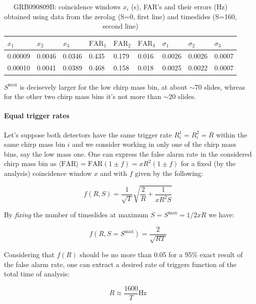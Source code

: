 \documentclass[epsf]{article}
\begin{document}
\begin{table}[ht!]
 \begin{tabular}{|l|l|l|l|l|l|l|l|l|}
 \hline
 \hline
 $x_1$ & $x_2$ & $x_3$ & $\mathrm{FAR}_1$ & $\mathrm{FAR}_2$ & $\mathrm{FAR}_3$ & $\sigma_1$ & $\sigma_2$ & $\sigma_3$ \\
 \hline
 0.00009 & 0.0046 & 0.0346 & 0.435 & 0.179 & 0.016 & 0.0026 & 0.0026 & 0.0007 \\
 \hline
 0.00010 & 0.0041 & 0.0389 & 0.468 & 0.158 & 0.018 & 0.0025 & 0.0022 & 0.0007 \\
 \hline
 \hline
 \end{tabular} 
 \caption{GRB090809B: coincidence windows $x_i$ (s), FAR's and their errors (Hz) obtained using data from the zerolag (S=0, first line) and timeslides (S=160, second line)}
 \label{xes}
\end{table}
 
$S^{\mathrm{max}}$ is decisevely larger for the low chirp mass bin, at about $\sim$70 slides, whreas for the other two chirp mass bins it's not more than $\sim$20 slides.

\paragraph{Equal trigger rates} 
Let's suppose both detectors have the same trigger rate $R^1_i=R^2_i=R$ within the same chirp mass bin $i$ and we consider working in only one of the chirp mass bins, say the low mass one. One can express the false alarm rate in the considered chirp mass bin as $\langle \mathrm{FAR} \rangle= \mathrm{FAR}(1 \pm f)=xR^2(1 \pm f)$ for a fixed (by the analysis) coincidence window $x$ and with $f$ given by the following:

\begin{equation}
f(R, S) = \frac{1}{\sqrt{T}} \sqrt{\frac{2}{R} + \frac{1}{xR^2S}}
\label{fequal}
\end{equation}

By \emph{fixing} the number of timeslides at maximum $S=S^{\mathrm{max}}=1/2xR$ we have:

\begin{equation}
f(R, S=S^{\mathrm{max}}) = \frac{2}{\sqrt{RT}}
\end{equation}

Considering that $f(R)$ should be no more than 0.05 for a 95$\%$ exact result of the false alarm rate, one can extract a desired rate of triggers function of the total time of analysis:

\begin{equation}
\label{1600rate}
R \approx \frac{1600}{T} \mathrm{Hz}
\end{equation}
\end{document}
